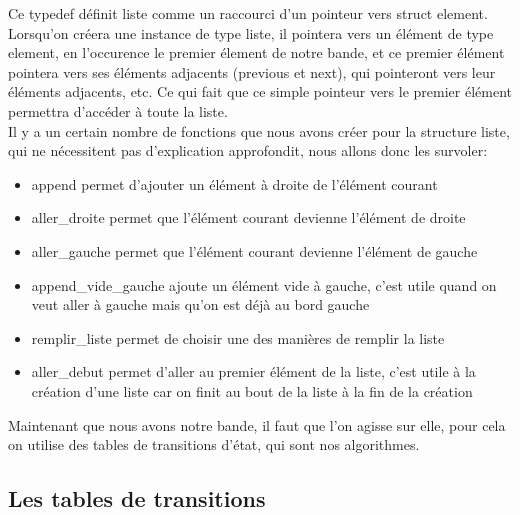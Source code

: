 \documentclass[a4paper,10pt]{article}
\begin{document}
        Ce typedef définit liste comme un raccourci d'un pointeur vers struct element. Lorsqu'on créera une instance de type liste, il pointera vers un élément de type element, en l'occurence le premier élement de notre bande, et ce premier élément pointera vers ses éléments adjacents (previous et next), qui pointeront vers leur éléments adjacents, etc. Ce qui fait que ce simple pointeur vers le premier élément permettra d'accéder à toute la liste.
        \\[1 em]
        
        Il y a un certain nombre de fonctions que nous avons créer pour la structure liste, qui ne nécessitent pas d'explication approfondit, nous allons donc les survoler:
        \begin{itemize}
        \item append permet d'ajouter un élément à droite de l'élément courant
        \item aller\_droite permet que l'élément courant devienne l'élément de droite
        \item aller\_gauche permet que l'élément courant devienne l'élément de gauche
        \item append\_vide\_gauche ajoute un élément vide à gauche, c'est utile quand on veut aller à gauche mais qu'on est déjà au bord gauche
        \item remplir\_liste permet de choisir une des manières de remplir la liste
        \item aller\_debut permet d'aller au premier élément de la liste, c'est utile à la création d'une liste car on finit au bout de la liste à la fin de la création
        \end{itemize}
        
        Maintenant que nous avons notre bande, il faut que l'on agisse sur elle, pour cela on utilise des tables de transitions d'état, qui sont nos algorithmes.
        
    \subsection{Les tables de transitions}
\end{document}
